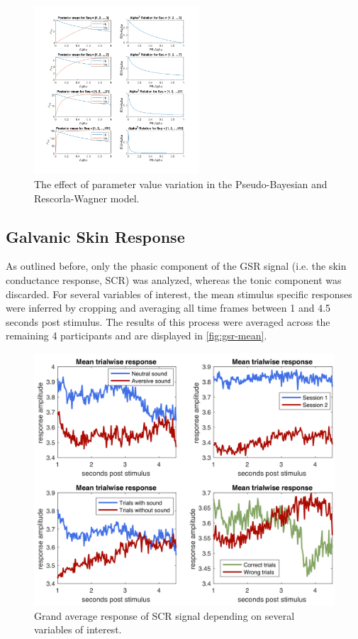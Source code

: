 \documentclass{article}
\begin{document}
\begin{multicols}{2}
\begin{figure}[H]
\vspace{-0.5cm}
\hspace{-0.8cm}
\includegraphics[width = 0.55\textwidth]{alpha_relation_1.png}
\vspace{-10mm}
\caption{The effect of parameter value variation in the Pseudo-Bayesian and Rescorla-Wagner model.}
\label{fig:alphaalpha}
\end{figure}



\subsection*{Galvanic Skin Response}
As outlined before, only the phasic component of the GSR signal (i.e. the skin conductance response, SCR) was analyzed, whereas the tonic component was discarded. For several variables of interest, the mean stimulus specific responses were inferred by cropping and averaging all time frames between 1 and 4.5 seconds post stimulus. The results of this process were averaged across the remaining 4 participants and are displayed in \autoref{fig:gsr-mean}. 
\begin{figure}[H]
\begin{centering}
\hspace{-0.2cm}
  \includegraphics[width=.45\textwidth]{gsr_mean_res}
  \caption{Grand average response of SCR signal depending on several variables of interest.}
  \label{fig:gsr-mean}
\end{centering}
\end{figure}


\end{multicols}
\end{document}
